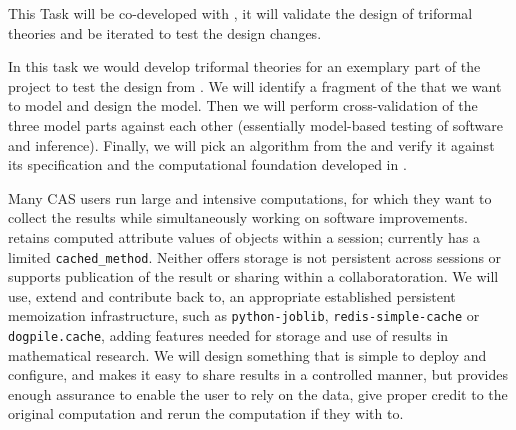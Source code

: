 \begin{workpackage}[id=dksbases,%
  title=Dks/Knowledge/Software-Bases,lead=JU,
  ZHRM=12,JURM=36,USHRM=12,UWRM=25,SARM=10,LLRM=2,PSRM=4]
\begin{tasklist}
\begin{task}[title=FindStat Case Study (triformal theories),id=data-findstat,
  lead=JU,partners={ZH},PM=3,wphases=18-24!.5]
  This Task will be co-developed with , it will validate
  the design of triformal theories and be iterated to test the design changes.
\end{task}

\begin{task}[title=\LMFDB Case study (triformal theories),id=data-LMFDB,
  lead=JU,partners={ZH,UW},PM=12,wphases=24-48!.5]
  In this task we would develop triformal theories for an exemplary part of the \LMFDB
  project to test the design from .  We will identify a
  fragment of the \LMFDB that we want to model and design the model. Then we will perform
  cross-validation of the three model parts against each other (essentially model-based
  testing of software and inference). Finally, we will pick an algorithm from the \LMFDB
  and verify it against its specification and the computational foundation developed in
  . 
  \end{task}

\begin{task}[title=Memoization and production of new data,id=data-memo,
  lead=SA,partners={US,PS,UW},PM=12,wphases=24-48!.5]
  Many CAS users run large and intensive computations, for which they want to collect the
  results while simultaneously working on software improvements. \GAP retains computed
  attribute values of objects within a session; \Sage currently has a limited
  \lstinline{cached_method}. Neither offers storage is not persistent across sessions or
  supports publication of the result or sharing within a collaboratoration. We will use,
  extend and contribute back to, an appropriate established persistent memoization
  infrastructure, such as \texttt{python-joblib}, \texttt{redis-simple-cache} or
  \texttt{dogpile.cache}, adding features needed for storage and use of results in
  mathematical research. We will design something that is simple to deploy and configure,
  and makes it easy to share results in a controlled manner, but provides enough assurance
  to enable the user to rely on the data, give proper credit to the original computation
  and rerun the computation if they with to.

\end{task}
\end{tasklist}


\end{workpackage}
